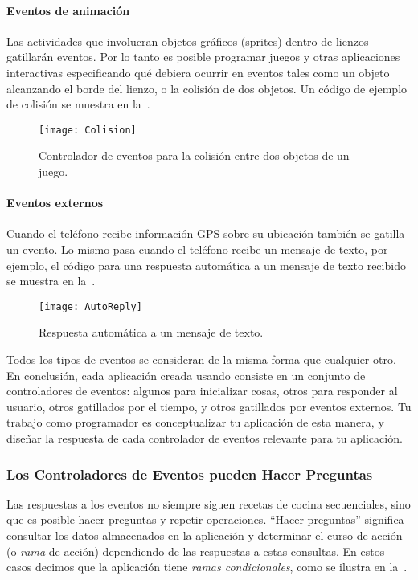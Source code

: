 \paragraph{Eventos de animación}
Las actividades que involucran objetos gráficos (sprites) dentro de
lienzos gatillarán eventos. Por lo tanto es posible programar juegos y
otras aplicaciones interactivas especificando qué debiera ocurrir en
eventos tales como un objeto alcanzando el borde del lienzo, o la
colisión de dos objetos. Un código de ejemplo de colisión se muestra
en la~.

\begin{figure}[H]
\centering
\texttt{[image: Colision]}
\caption{Controlador de eventos para la colisión entre dos objetos de
  un juego.}
\label{fig:colision}
\end{figure}

\paragraph{Eventos externos}

Cuando el teléfono recibe información GPS sobre su ubicación también
se gatilla un evento. Lo mismo pasa cuando el teléfono recibe un
mensaje de texto, por ejemplo, el código para una respuesta automática
a un mensaje de texto recibido se muestra en la~.

\begin{figure}[H]
\centering
\texttt{[image: AutoReply]}
\caption{Respuesta automática a un mensaje de texto.}
\label{fig:colision}
\end{figure}

Todos los tipos de eventos se consideran de la misma forma que
cualquier otro. En conclusión, cada aplicación creada usando
\AppInventor consiste en un conjunto de controladores de eventos:
algunos para inicializar cosas, otros para responder al usuario, otros
gatillados por el tiempo, y otros gatillados por eventos externos. Tu
trabajo como programador es conceptualizar tu aplicación de esta
manera, y diseñar la respuesta de cada controlador de eventos
relevante para tu aplicación.

\subsubsection*{Los Controladores de Eventos pueden Hacer Preguntas}
Las respuestas a los eventos no siempre siguen recetas de cocina
secuenciales, sino que es posible hacer preguntas y repetir
operaciones. ``Hacer preguntas'' significa consultar los datos
almacenados en la aplicación y determinar el curso de acción (o
\emph{rama} de acción) dependiendo de las respuestas a estas
consultas. En estos casos decimos que la aplicación tiene \emph{ramas
  condicionales}, como se ilustra en la~.

